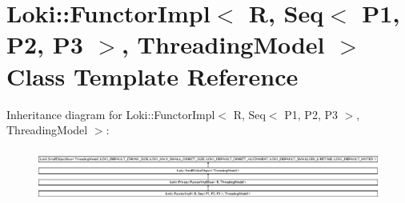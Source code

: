 \hypertarget{classLoki_1_1FunctorImpl_3_01R_00_01Seq_3_01P1_00_01P2_00_01P3_01_4_00_01ThreadingModel_01_4}{}\section{Loki\+:\+:Functor\+Impl$<$ R, Seq$<$ P1, P2, P3 $>$, Threading\+Model $>$ Class Template Reference}
\label{classLoki_1_1FunctorImpl_3_01R_00_01Seq_3_01P1_00_01P2_00_01P3_01_4_00_01ThreadingModel_01_4}
Inheritance diagram for Loki\+:\+:Functor\+Impl$<$ R, Seq$<$ P1, P2, P3 $>$, Threading\+Model $>$\+:\begin{figure}[H]
\begin{center}
\leavevmode
\includegraphics[height=1.751368cm]{classLoki_1_1FunctorImpl_3_01R_00_01Seq_3_01P1_00_01P2_00_01P3_01_4_00_01ThreadingModel_01_4}
\end{center}
\end{figure}
